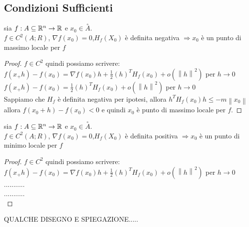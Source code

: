 \subsection{Condizioni Sufficienti}
\proposition
sia $f:A\subseteq \mathbb{R}^n\rightarrow \mathbb{R}$ e $x_0\in\overset{\circ}{A}$.\\
$f\in C^2(A;R)$, $\nabla f(x_0)=0$,$H_f(X_0)$ è definita negativa $\Rightarrow x_0$ è un punto di massimo locale per $f$
\begin{proof}
	$f\in C^2$ quindi possiamo scrivere:\\
	$f(x_+h)-f(x_0)=\nabla f(x_0)h+\frac{1}{2}(h)^TH_f(x_0)+o(\left\|h\right\|^2)$ per $h\rightarrow 0$\\
	$f(x_+h)-f(x_0)=\frac{1}{2}(h)^TH_f(x_0)+o(\left\|h\right\|^2)$ per $h\rightarrow 0$\\
	Sappiamo che $H_f$ è definita negativa per ipotesi, allora $h^TH_f(x_0)h\le -m\left\|x_0\right\|$ allora $f(x_0+h)-f(x_0)<0$ e quindi $x_0$ è punto di massimo locale per $f$.
\end{proof} 
\proposition
sia $f:A\subseteq \mathbb{R}^n\rightarrow \mathbb{R}$ e $x_0\in\overset{\circ}{A}$.\\
$f\in C^2(A;R)$, $\nabla f(x_0)=0$,$H_f(X_0)$ è definita positiva $\Rightarrow x_0$ è un punto di minimo locale per $f$
\begin{proof}
	$f\in C^2$ quindi possiamo scrivere:\\
	$f(x_+h)-f(x_0)=\nabla f(x_0)h+\frac{1}{2}(h)^TH_f(x_0)+o(\left\|h\right\|^2)$ per $h\rightarrow 0$\\
	...........\\
	...........\\
\end{proof} 
QUALCHE DISEGNO E SPIEGAZIONE.....
